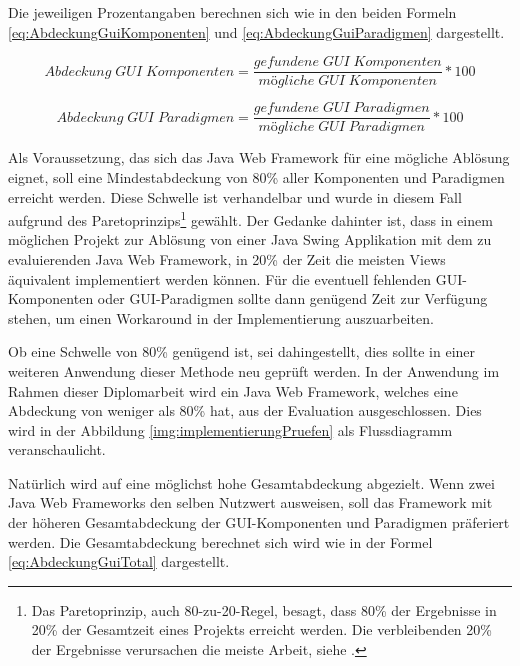   Die jeweiligen Prozentangaben berechnen sich wie in den beiden Formeln
  \ref{eq:AbdeckungGuiKomponenten} und \ref{eq:AbdeckungGuiParadigmen}
  dargestellt.

  \begin{equation}
    \label{eq:AbdeckungGuiKomponenten}
    Abdeckung\;GUI\;Komponenten = \frac
    	{gefundene\;GUI\;Komponenten}
    	{mögliche\;GUI\;Komponenten} * 100
  \end{equation}

  \begin{equation}
    \label{eq:AbdeckungGuiParadigmen}
    Abdeckung\;GUI\;Paradigmen = \frac
    	{gefundene\;GUI\;Paradigmen}
    	{mögliche\;GUI\;Paradigmen} * 100
  \end{equation}
  
  Als Voraussetzung, das sich das Java Web Framework für eine mögliche Ablösung
  eignet, soll eine Mindestabdeckung von 80\% aller Komponenten und
  Paradigmen erreicht werden. Diese Schwelle ist verhandelbar und wurde in
  diesem Fall aufgrund des Paretoprinzips\footnote{Das Paretoprinzip, auch
  80-zu-20-Regel, besagt, dass 80\% der Ergebnisse in 20\% der Gesamtzeit eines
  Projekts erreicht werden. Die verbleibenden 20\% der Ergebnisse verursachen
  die meiste Arbeit, siehe \cite{Paretoprinzip}.} gewählt. Der Gedanke dahinter
  ist, dass in einem möglichen Projekt zur Ablösung von einer Java Swing
  Applikation mit dem zu evaluierenden Java Web Framework, in 20\% der Zeit die
  meisten Views äquivalent implementiert werden können. Für die eventuell
  fehlenden GUI-Komponenten oder GUI-Paradigmen sollte dann genügend Zeit zur
  Verfügung stehen, um einen Workaround in der Implementierung auszuarbeiten.
  
  Ob eine Schwelle von 80\% genügend ist, sei dahingestellt, dies sollte in
  einer weiteren Anwendung dieser Methode neu geprüft werden. In der Anwendung
  im Rahmen dieser Diplomarbeit wird ein Java Web Framework, welches eine
  Abdeckung von weniger als 80\% hat, aus der Evaluation ausgeschlossen. Dies
  wird in der Abbildung \ref{img:implementierungPruefen} als Flussdiagramm
  veranschaulicht.
  
  Natürlich wird auf eine möglichst hohe Gesamtabdeckung abgezielt. Wenn zwei
  Java Web Frameworks den selben Nutzwert ausweisen, soll das Framework mit der
  höheren Gesamtabdeckung der GUI-Komponenten und Paradigmen präferiert werden.
  Die Gesamtabdeckung berechnet sich wird wie in der Formel
  \ref{eq:AbdeckungGuiTotal} dargestellt.
  
